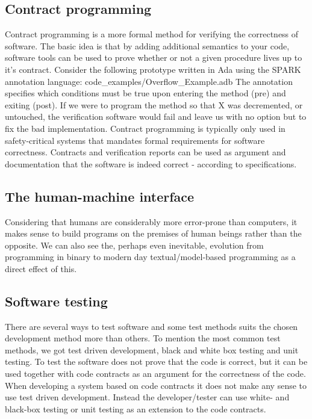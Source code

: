 \documentclass[10pt,a4paper]{article}
\begin{document}
\subsection{Contract programming}
Contract programming is a more formal method for verifying the correctness of software.
The basic idea is that by adding additional semantics to your code, software tools can be used to prove whether or not a given procedure lives up to it's contract.
Consider the following prototype written in Ada using the SPARK annotation language:
 {code_examples/Overflow_Example.adb}
The annotation specifies which conditions must be true upon entering the method (pre) and exiting (post). If we were to program the method so that X was decremented, or untouched, the verification software would fail and leave us with no option but to fix the bad implementation.
Contract programming is typically only used in safety-critical systems that mandates formal requirements for software correctness. Contracts and verification reports can be used as argument and documentation that the software is indeed correct - according to specifications.

\subsection{The human-machine interface}
Considering that humans are considerably more error-prone than computers, it makes sense to build programs on the premises of human beings rather than the opposite. We can also see the, perhaps even inevitable, evolution from programming in binary to modern day textual/model-based programming as a direct effect of this.

\subsection{Software testing}
There are several ways to test software and some test methods suits the chosen development method more than others. To mention the most common test methods, we got test driven development, black and white box testing and unit testing.
To test the software does not prove that the code is correct, but it can be used together with code contracts as an argument for the correctness of the code.
When developing a system based on code contracts it does not make any sense to use test driven development. Instead the developer/tester can use white- and black-box testing or unit testing as an extension to the code contracts.
\end{document}
